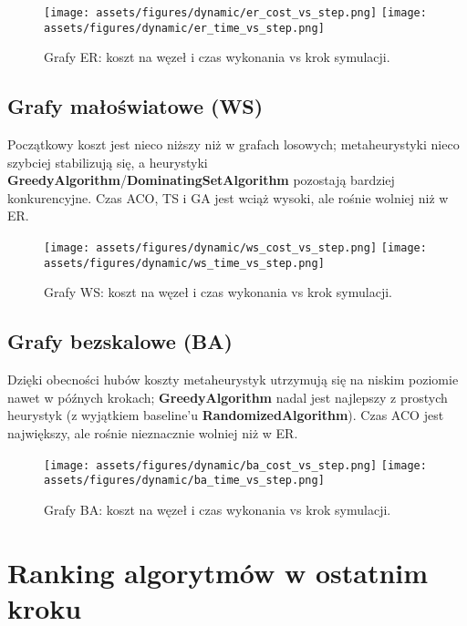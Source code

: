 \begin{figure}[H]
  \centering
  \texttt{[image: assets/figures/dynamic/er\_cost\_vs\_step.png]}
  \texttt{[image: assets/figures/dynamic/er\_time\_vs\_step.png]}
  \caption{Grafy ER: koszt na węzeł i czas wykonania vs krok symulacji.}
  \label{fig:er_cost_step}
\end{figure}

\subsection{Grafy małoświatowe (WS)}

Początkowy koszt jest nieco niższy niż w grafach losowych; metaheurystyki nieco szybciej stabilizują się, a heurystyki \textbf{GreedyAlgorithm}/\textbf{DominatingSetAlgorithm} pozostają bardziej konkurencyjne. Czas ACO, TS i GA jest wciąż wysoki, ale rośnie wolniej niż w ER.

\begin{figure}[H]
  \centering
  \texttt{[image: assets/figures/dynamic/ws\_cost\_vs\_step.png]}
  \texttt{[image: assets/figures/dynamic/ws\_time\_vs\_step.png]}
  \caption{Grafy WS: koszt na węzeł i czas wykonania vs krok symulacji.}
  \label{fig:ws_cost_step}
\end{figure}

\subsection{Grafy bezskalowe (BA)}

Dzięki obecności hubów koszty metaheurystyk utrzymują się na niskim poziomie nawet w późnych krokach; \textbf{GreedyAlgorithm} nadal jest najlepszy z prostych heurystyk (z wyjątkiem baseline'u \textbf{RandomizedAlgorithm}). Czas ACO jest największy, ale rośnie nieznacznie wolniej niż w ER.

\begin{figure}[H]
  \centering
  \texttt{[image: assets/figures/dynamic/ba\_cost\_vs\_step.png]}
  \texttt{[image: assets/figures/dynamic/ba\_time\_vs\_step.png]}
  \caption{Grafy BA: koszt na węzeł i czas wykonania vs krok symulacji.}
  \label{fig:ba_time_step}
\end{figure}

\section{Ranking algorytmów w ostatnim kroku}

